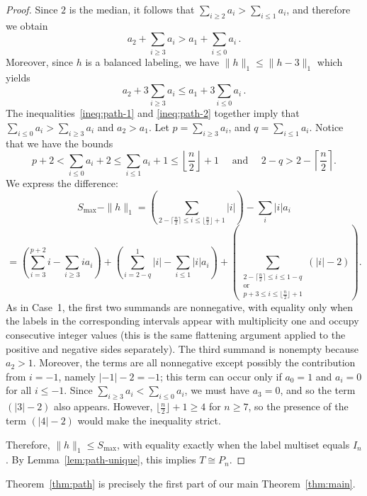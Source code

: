 \documentclass[12pt,reqno]{amsart}
\theoremstyle{definition}
\begin{document}
\begin{proof}
Since $2$ is the median, it follows that $\sum_{i\geq 2}a_i>\sum_{i\le 1}a_i$, and therefore we obtain
\begin{equation}\label{ineq:path-1}
a_2 + \sum_{i\geq 3}a_i > a_1 + \sum_{i\le 0} a_i \, .
\end{equation}
 Moreover, since $h$ is a balanced labeling, we have $\|h\|_1\le \|h-3\|_1$ which yields
\begin{equation}\label{ineq:path-2}
a_2+3\sum_{i\geq 3}a_i\le a_1+3\sum_{i\le 0}a_i \, .
\end{equation}
The inequalities~\eqref{ineq:path-1} and \eqref{ineq:path-2} together imply that $\sum_{i\le 0} a_i > \sum _{i\geq 3} a_i$ and $a_2>a_1$. Let $p=\sum_{i\geq 3} a_i$, and $q=\sum_{i\le 1} a_i$. Notice that we have the bounds
\[
p+2<\sum_{i\le 0}a_i+2\le \sum_{i\le 1}a_i+1\le \left\lfloor\frac{n}{2}\right\rfloor+1 \quad \text{ and } \quad  2-q > 2-\left\lceil\frac{n}{2}\right\rceil.
\]
We express the difference:
$$
S_{\max}-\|h\|_1=\left(\sum_{2-\lceil \frac{n}{2}\rceil\le i\le \lfloor\frac{n}{2}\rfloor+1}|i|\right)-\sum_{i}|i|a_i
$$
$$=\left(\sum_{i=3}^{p+2} i-\sum_{i\geq 3}ia_i \right)+\left(\sum_{i=2-q}^{1} |i|-\sum_{i\le 1}|i|a_i \right)+\left(\sum_{\substack{2-\lceil \frac{n}{2}\rceil\le i\le 1-q \\ 
\text{or} \\
p+3\le i\le \lfloor\frac{n}{2}\rfloor+1}} \left(|i|-2\right) \right).
 $$
As in Case~1, the first two summands are nonnegative, with equality only when the labels in the corresponding intervals appear with multiplicity one and occupy consecutive integer values (this is the same flattening argument applied to the positive and negative sides separately). The third summand is nonempty because $a_2>1$. Moreover, the terms are all nonnegative except possibly the contribution from $i=-1$, namely $|-1|-2 = -1$; this term can occur only if $a_0=1$ and $a_i=0$ for all $i\le -1$. Since $\sum_{i\geq 3}a_i< \sum_{i\le 0} a_i$, we must have $a_3=0$, and so the term $(|3|-2)$ also appears. However, $\lfloor \frac{n}{2}\rfloor+1 \geq 4$ for $n\geq 7$, so the presence of the term $(|4|-2)$ would make the inequality strict. 

Therefore, $\|h\|_1 \le S_{\max}$, with equality exactly when the label multiset equals $I_n$. By Lemma~\ref{lem:path-unique}, this implies $T \cong P_n$.
\end{proof}

Theorem~\ref{thm:path} is precisely the first part of our main Theorem~\ref{thm:main}.
\end{document}
